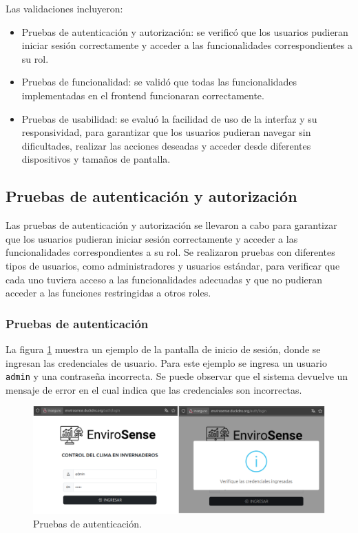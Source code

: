 Las validaciones incluyeron:

\begin{itemize}
    \item Pruebas de autenticación y autorización: se verificó que los usuarios pudieran
          iniciar sesión correctamente y acceder a las funcionalidades correspondientes a
          su rol.
    \item Pruebas de funcionalidad: se validó que todas las funcionalidades implementadas
          en el frontend funcionaran correctamente.
    \item Pruebas de usabilidad: se evaluó la facilidad de uso de la interfaz y su
          responsividad, para garantizar que los usuarios pudieran navegar sin
          dificultades, realizar las acciones deseadas y acceder desde diferentes
          dispositivos y tamaños de pantalla.
\end{itemize}

\subsection{Pruebas de autenticación y autorización}

Las pruebas de autenticación y autorización se llevaron a cabo para garantizar
que los usuarios pudieran iniciar sesión correctamente y acceder a las
funcionalidades correspondientes a su rol. Se realizaron pruebas con diferentes
tipos de usuarios, como administradores y usuarios estándar, para verificar que
cada uno tuviera acceso a las funcionalidades adecuadas y que no pudieran
acceder a las funciones restringidas a otros roles.

\subsubsection{Pruebas de autenticación}

La figura \ref{fig:login} muestra un ejemplo de la pantalla de inicio de
sesión, donde se ingresan las credenciales de usuario. Para este ejemplo se
ingresa un usuario \texttt{admin} y una contraseña incorrecta. Se puede
observar que el sistema devuelve un mensaje de error en el cual indica que las
credenciales son incorrectas.

\begin{figure}[H]
    \centering
    \includegraphics[width=\textwidth]{Images/41_intento_login.png}
    \caption[Pruebas de autenticación]{Pruebas de autenticación.}
    \label{fig:login}
\end{figure}

